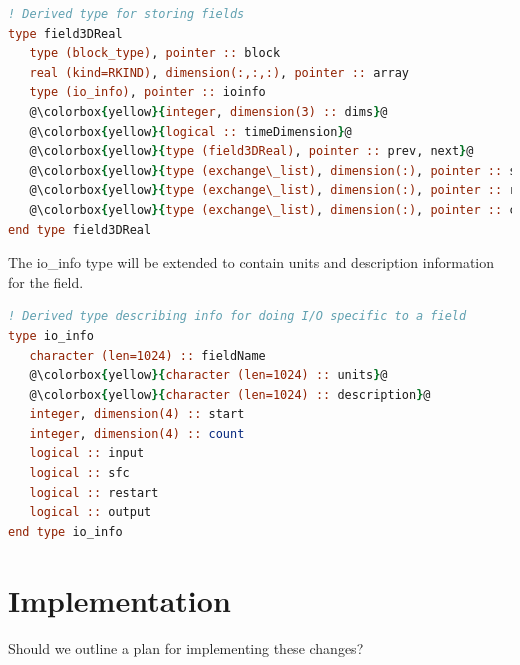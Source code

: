 \documentclass[11pt]{report}
\begin{document}
\begin{lstlisting}[language=fortran,escapechar=@,frame=single]
! Derived type for storing fields
type field3DReal
   type (block_type), pointer :: block
   real (kind=RKIND), dimension(:,:,:), pointer :: array
   type (io_info), pointer :: ioinfo
   @\colorbox{yellow}{integer, dimension(3) :: dims}@
   @\colorbox{yellow}{logical :: timeDimension}@
   @\colorbox{yellow}{type (field3DReal), pointer :: prev, next}@
   @\colorbox{yellow}{type (exchange\_list), dimension(:), pointer :: sendList}@
   @\colorbox{yellow}{type (exchange\_list), dimension(:), pointer :: recvList}@
   @\colorbox{yellow}{type (exchange\_list), dimension(:), pointer :: copyList}@
end type field3DReal
\end{lstlisting}
\vspace{12pt}

The io\_info type will be extended to contain units and description information for the field.
\linebreak

\begin{lstlisting}[language=fortran,escapechar=@,frame=single]
! Derived type describing info for doing I/O specific to a field
type io_info
   character (len=1024) :: fieldName
   @\colorbox{yellow}{character (len=1024) :: units}@
   @\colorbox{yellow}{character (len=1024) :: description}@
   integer, dimension(4) :: start
   integer, dimension(4) :: count
   logical :: input
   logical :: sfc
   logical :: restart
   logical :: output
end type io_info
\end{lstlisting}


%
%
\chapter{Implementation}

Should we outline a plan for implementing these changes?
\end{document}

